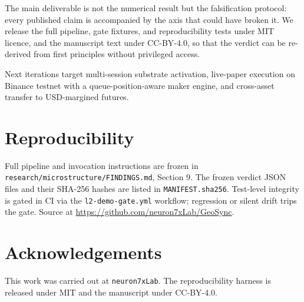 \documentclass[11pt,a4paper]{article}
\begin{document}
The main deliverable is not the numerical result but the falsification
protocol: every published claim is accompanied by the axis that could
have broken it. We release the full pipeline, gate fixtures, and
reproducibility tests under MIT licence, and the manuscript text under
CC-BY-4.0, so that the verdict can be re-derived from first principles
without privileged access.

Next iterations target multi-session substrate activation, live-paper
execution on Binance testnet with a queue-position-aware maker engine,
and cross-asset transfer to USD-margined futures.

\section*{Reproducibility}

Full pipeline and invocation instructions are frozen in
\texttt{research/microstructure/FINDINGS.md}, Section 9. The frozen
verdict JSON files and their SHA-256 hashes are listed in
\texttt{MANIFEST.sha256}. Test-level integrity is gated in CI via the
\texttt{l2-demo-gate.yml} workflow; regression or silent drift trips
the gate. Source at
\url{https://github.com/neuron7xLab/GeoSync}.

\section*{Acknowledgements}

This work was carried out at \texttt{neuron7xLab}. The reproducibility
harness is released under MIT and the manuscript under CC-BY-4.0.



\end{document}
